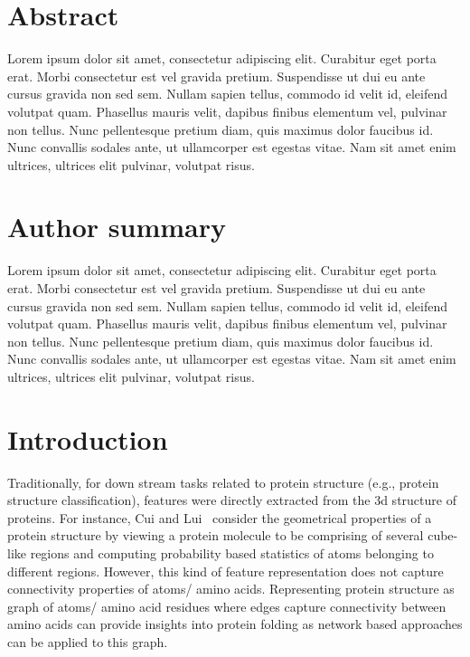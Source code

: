 \documentclass[10pt,letterpaper]{article}
\begin{document}
\section*{Abstract}
Lorem ipsum dolor sit amet, consectetur adipiscing elit. Curabitur eget porta erat. Morbi consectetur est vel gravida pretium. Suspendisse ut dui eu ante cursus gravida non sed sem. Nullam sapien tellus, commodo id velit id, eleifend volutpat quam. Phasellus mauris velit, dapibus finibus elementum vel, pulvinar non tellus. Nunc pellentesque pretium diam, quis maximus dolor faucibus id. Nunc convallis sodales ante, ut ullamcorper est egestas vitae. Nam sit amet enim ultrices, ultrices elit pulvinar, volutpat risus.


\section*{Author summary}
Lorem ipsum dolor sit amet, consectetur adipiscing elit. Curabitur eget porta erat. Morbi consectetur est vel gravida pretium. Suspendisse ut dui eu ante cursus gravida non sed sem. Nullam sapien tellus, commodo id velit id, eleifend volutpat quam. Phasellus mauris velit, dapibus finibus elementum vel, pulvinar non tellus. Nunc pellentesque pretium diam, quis maximus dolor faucibus id. Nunc convallis sodales ante, ut ullamcorper est egestas vitae. Nam sit amet enim ultrices, ultrices elit pulvinar, volutpat risus.

\linenumbers

\section*{Introduction}\label{sec1}
Traditionally, for down stream tasks related to protein structure (e.g., protein structure classification), features were directly extracted from the 3d structure of proteins. For instance, Cui and Lui~\cite{ciu20083dprotein} consider the geometrical properties of a protein structure by viewing a protein molecule to be comprising of several cube-like regions and computing probability based statistics of atoms belonging to different regions. However, this kind of feature representation does not capture connectivity properties of atoms/ amino acids. Representing protein structure as graph of atoms/ amino acid residues where edges capture connectivity between amino acids can provide insights into protein folding as network based approaches can be applied to this graph. 
\end{document}
